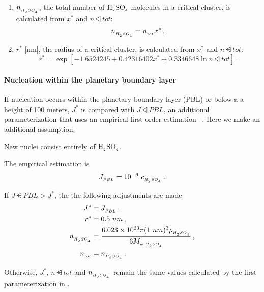 \begin{enumerate}
        .
  \item $n_{_{H_{_2}SO_{_4}}}$, the total number of $\rm H_{_2}SO_{_4}$ molecules in a critical
        cluster, is calculated from $x^*$ and $n\dsub{tot}$:
        \begin{equation}
          n_{_{H_{_2}SO_{_4}}} = n_{_{tot}} x^* \,.
        \end{equation}
  \item $r^*$ [nm], the radius of a critical cluster, is calculated from
        $x^*$ and $n\dsub{tot}$:
        \begin{equation}
          r^* = \exp \left[ -1.6524245 + 0.42316402 x^* +
                0.3346648 \ln n\dsub{tot} \right] \,.
        \end{equation}
\end{enumerate}

\paragraph{Nucleation within the planetary boundary layer} 

If nucleation occurs within the planetary boundary layer (PBL) or below a
a height of 100 meters, $J^*$ is compared with $J\dsub{PBL}$, an additional
parameterization that uses an empirical first-order estimation
~\cite{sihto-2006-acp,wang-2009-acp}. Here we make an additional assumption:

\begin{assume}
  New nuclei consist entirely of $\rm H_{_2}SO_{_4}$.
\end{assume}

The empirical estimation is
\begin{equation}
  J_{_{PBL}} = 10^{-6}~c_{_{H_{_2}SO_{_4}}} \,.
\end{equation}

If $J\dsub{PBL} > J^*$, the the following adjustments are made:
\begin{align}
  J^* &= J_{_{PBL}} \,, \\
  r^* &= 0.5~nm \,, \\
  n_{_{H_{_2}SO_{_4}}} &= \frac{6.023 \times 10^{23} \pi (1~nm)^3
                  \rho_{_{H_{_2}SO_{_4}}}}{6 M_{_{w,H_{_2}SO_{_4}}}} \,, \\
  n_{_{tot}} &= n_{_{H_{_2}SO_{_4}}} \,.
\end{align}

Otherwise, $J^*$, $n\dsub{tot}$ and $n_{_{H_{_2}SO_{_4}}}$ remain the same values
calculated by the first parameterization in .

